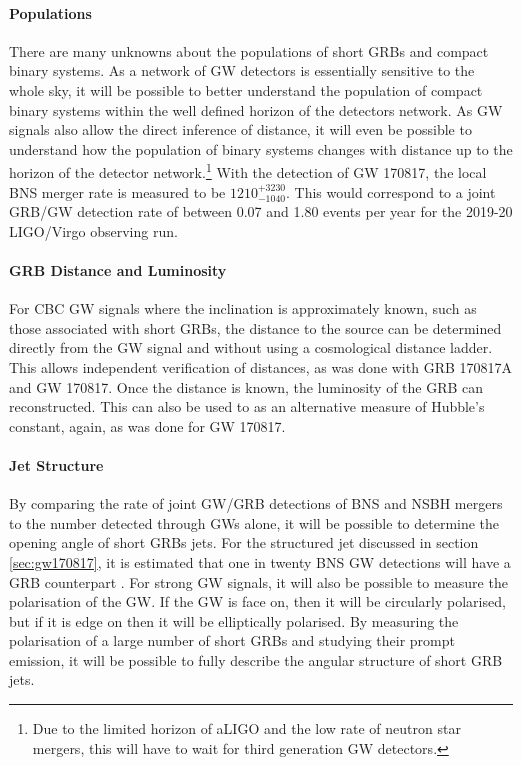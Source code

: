 \documentclass[11pt]{cuthesis}
\begin{document}
\paragraph{Populations}
There are many unknowns about the populations of short GRBs and compact binary systems. As a network of GW detectors is essentially sensitive to the whole sky, it will be possible to better understand the population of compact binary systems within the well defined horizon of the detectors network. As GW signals also allow the direct inference of distance, it will even be possible to understand how the population of binary systems changes with distance up to the horizon of the detector network.\footnote{Due to the limited horizon of aLIGO and the low rate of neutron star mergers, this will have to wait for third generation GW detectors.} With the detection of GW 170817, the local BNS merger rate is measured to be $1210^{+3230}_{-1040}$. \cite{catalog} This would correspond to a joint GRB/GW detection rate of between 0.07 and 1.80 events per year for the 2019-20 LIGO/Virgo observing run. \cite{GW170817_GRB} 

\paragraph{GRB Distance and Luminosity}
For CBC GW signals where the inclination is approximately known, such as those associated with short GRBs, the distance to the source can be determined directly from the GW signal and without using a cosmological distance ladder. This allows independent verification of distances, as was done with GRB 170817A and GW 170817. Once the distance is known, the luminosity of the GRB can reconstructed. This can also be used to as an alternative measure of Hubble's constant, again, as was done for GW 170817. \cite{hubble_constant} 

\paragraph{Jet Structure}
By comparing the rate of joint GW/GRB detections of BNS and NSBH mergers to the number detected through GWs alone, it will be possible to determine the opening angle of short GRBs jets. For the structured jet discussed in section \ref{sec:gw170817}, it is estimated that one in twenty BNS GW detections will have a GRB counterpart \cite{Lazzati_afterglow}. For strong GW signals, it will also be possible to measure the polarisation of the GW. If the GW is face on, then it will be circularly polarised, but if it is edge on then it will be elliptically polarised. By measuring the polarisation of a large number of short GRBs and studying their prompt emission, it will be possible to fully describe the angular structure of short GRB jets. 
\end{document}
